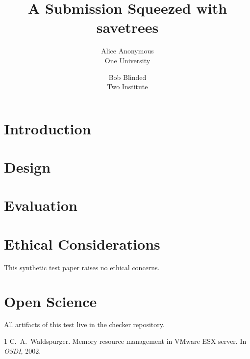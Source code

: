 \documentclass[letterpaper,twocolumn,10pt]{article}
\date{}
\title{\Large \bf A Submission Squeezed with savetrees}
\author{{\rm Alice Anonymous}\\One University \and {\rm Bob Blinded}\\Two Institute}
\begin{document}
\maketitle

\begin{abstract}
\lipsum[1][1-5]
\end{abstract}

\section{Introduction}
\lipsum[2-4]

\section{Design}
\lipsum[5-7]

\section{Evaluation}
\lipsum[8-9]

\appendix
\section*{Ethical Considerations}
This synthetic test paper raises no ethical concerns.

\section*{Open Science}
All artifacts of this test live in the checker repository.

\begin{thebibliography}{1}
 C.~A.\ Waldspurger. Memory resource management in VMware ESX
  server. In \emph{OSDI}, 2002.
\end{thebibliography}
\end{document}
